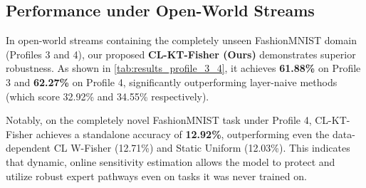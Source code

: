 \documentclass{article}
\theoremstyle{plain}
\theoremstyle{definition}
\theoremstyle{remark}
\begin{document}
\subsection{Performance under Open-World Streams}
In open-world streams containing the completely unseen FashionMNIST domain (Profiles 3 and 4), our proposed \textbf{CL-KT-Fisher (Ours)} demonstrates superior robustness. As shown in \cref{tab:results_profile_3_4}, it achieves \textbf{61.88\%} on Profile 3 and \textbf{62.27\%} on Profile 4, significantly outperforming layer-naive methods (which score 32.92\% and 34.55\% respectively). 

Notably, on the completely novel FashionMNIST task under Profile 4, CL-KT-Fisher achieves a standalone accuracy of \textbf{12.92\%}, outperforming even the data-dependent CL W-Fisher (12.71\%) and Static Uniform (12.03\%). This indicates that dynamic, online sensitivity estimation allows the model to protect and utilize robust expert pathways even on tasks it was never trained on.
\end{document}
